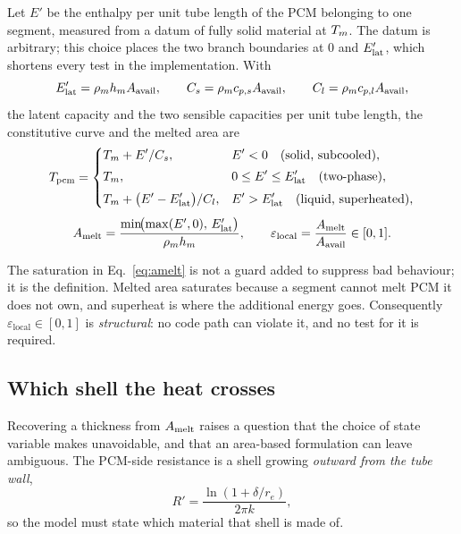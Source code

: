 Let $E'$ be the enthalpy per unit tube length of the PCM belonging to one
segment, measured from a datum of fully solid material at $T_{m}$. The datum is
arbitrary; this choice places the two branch boundaries at $0$ and $E'_{\mathrm{lat}}$,
which shortens every test in the implementation. With
\begin{equation}
  E'_{\mathrm{lat}} = \rho_{m}h_{m}A_{\mathrm{avail}},
  \qquad
  C_{s} = \rho_{m} c_{p,s}A_{\mathrm{avail}},
  \qquad
  C_{l} = \rho_{m} c_{p,l}A_{\mathrm{avail}},
  \label{eq:caps}
\end{equation}
the latent capacity and the two sensible capacities per unit tube length, the
constitutive curve and the melted area are
\begin{equation}
  T_{\mathrm{pcm}} =
  \begin{dcases}
    T_{m} + E'/C_{s}, & E' < 0 \quad\text{(solid, subcooled)},\\[2pt]
    T_{m}, & 0 \le E' \le E'_{\mathrm{lat}} \quad\text{(two-phase)},\\[2pt]
    T_{m} + \bigl(E'-E'_{\mathrm{lat}}\bigr)/C_{l},
      & E' > E'_{\mathrm{lat}} \quad\text{(liquid, superheated)},
  \end{dcases}
  \label{eq:enth-curve}
\end{equation}
\begin{equation}
  A_{\mathrm{melt}} = \frac{\min\!\bigl(\max(E',0),\,E'_{\mathrm{lat}}\bigr)}{\rho_{m}h_{m}},
  \qquad
  \varepsilon_{\mathrm{local}} = \frac{A_{\mathrm{melt}}}{A_{\mathrm{avail}}} \in [0,1].
  \label{eq:amelt}
\end{equation}

The saturation in Eq.~\eqref{eq:amelt} is not a guard added to suppress bad
behaviour; it is the definition. Melted area saturates because a segment cannot
melt PCM it does not own, and superheat is where the additional energy goes.
Consequently $\varepsilon_{\mathrm{local}}\in[0,1]$ is \emph{structural}: no
code path can violate it, and no test for it is required.

\subsection{Which shell the heat crosses}
\label{sec:shell}

Recovering a thickness from $A_{\mathrm{melt}}$ raises a question that the choice of state
variable makes unavoidable, and that an area-based formulation can leave
ambiguous. The PCM-side resistance is a shell growing \emph{outward from the
tube wall},
\begin{equation}
  R' = \frac{\ln\left(1+\delta/r_{e}\right)}{2\pi k},
  \label{eq:shell}
\end{equation}
so the model must state which material that shell is made of.

